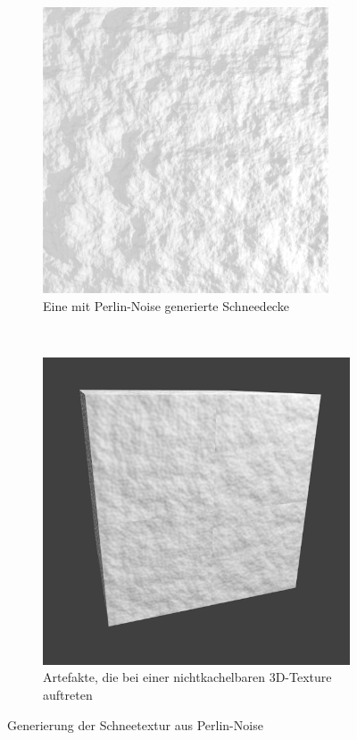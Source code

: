 \begin{figure}[h]
	\begin{subfigure}[t]{0.5\textwidth}
		\centering
		\includegraphics[width=\textwidth]{images/perlin_noise_snow}
		\caption{Eine mit Perlin-Noise generierte Schneedecke}
		\label{fig:implementation_fallen_snow_perlin_noise_snow}
	\end{subfigure}
	~
	\begin{subfigure}[t]{0.5\textwidth}
		\centering
		\includegraphics[width=\textwidth]{images/noise_texture_artifact}
		\caption{Artefakte, die bei einer nichtkachelbaren 3D-Texture auftreten}
		\label{fig:implementation_fallen_snow_perlin_noise_artifact}
	\end{subfigure}
        \caption{Generierung der Schneetextur aus Perlin-Noise}
\end{figure}

